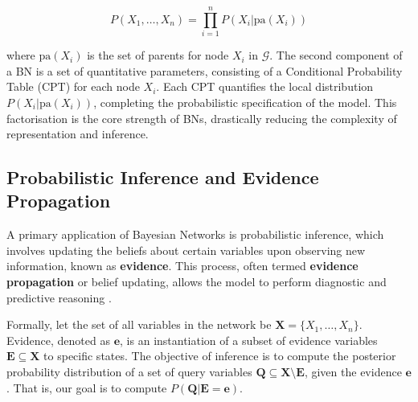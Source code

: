 \begin{equation}
P(X_1, \dots, X_n) = \prod_{i=1}^{n} P(X_i | \text{pa}(X_i))
\end{equation}

where $\text{pa}(X_i)$ is the set of parents for node $X_i$ in $\mathcal{G}$. The second component of a BN is a set of quantitative parameters, consisting of a Conditional Probability Table (CPT) for each node $X_i$. Each CPT quantifies the local distribution $P(X_i | \text{pa}(X_i))$, completing the probabilistic specification of the model. This factorisation is the core strength of BNs, drastically reducing the complexity of representation and inference.

\subsection{Probabilistic Inference and Evidence Propagation}
\label{subsec:evidence_propagation}

A primary application of Bayesian Networks is probabilistic inference, which involves updating the beliefs about certain variables upon observing new information, known as \textbf{evidence}. This process, often termed \textbf{evidence propagation} or belief updating, allows the model to perform diagnostic and predictive reasoning \citep{pearl1988probabilistic}.

Formally, let the set of all variables in the network be $\mathbf{X} = \{X_1, \dots, X_n\}$. Evidence, denoted as $\mathbf{e}$, is an instantiation of a subset of evidence variables $\mathbf{E} \subseteq \mathbf{X}$ to specific states. The objective of inference is to compute the posterior probability distribution of a set of query variables $\mathbf{Q} \subseteq \mathbf{X} \setminus \mathbf{E}$, given the evidence $\mathbf{e}$. That is, our goal is to compute $P(\mathbf{Q} | \mathbf{E} = \mathbf{e})$.

